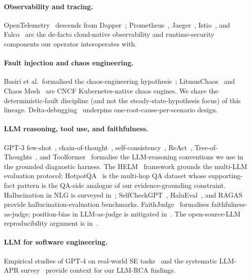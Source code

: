 \documentclass[sigconf, nonacm=true, anonymous=false, review=false]{acmart}
\begin{document}
\paragraph{Observability and tracing.} OpenTelemetry~\cite{opentelemetry_docs,
opentelemetry_operator} descends from Dapper~\cite{dapper_2010};
Prometheus~\cite{prometheus_cncf}, Jaeger~\cite{jaeger_cncf},
Istio~\cite{istio_service_mesh}, and Falco~\cite{falco_cncf} are
the de-facto cloud-native observability and runtime-security
components our operator interoperates with.

\paragraph{Fault injection and chaos engineering.}
Basiri et al.\ formalised the chaos-engineering
hypothesis~\cite{basiri_chaos_2016}; LitmusChaos~\cite{litmus_chaos_cncf}
and Chaos Mesh~\cite{chaos_mesh_cncf} are CNCF Kubernetes-native
chaos engines. We share the deterministic-fault discipline (and
not the steady-state-hypothesis focus) of this lineage.
Delta-debugging~\cite{zeller_delta_2002} underpins
one-root-cause-per-scenario design.

\paragraph{LLM reasoning, tool use, and faithfulness.}
GPT-3 few-shot~\cite{brown_gpt3_2020}, chain-of-thought~\cite{wei2022cot},
self-consistency~\cite{wang_selfconsistency_2023},
ReAct~\cite{yao2023react}, Tree-of-Thoughts~\cite{yao_tot_2023}, and
Toolformer~\cite{schick_toolformer_2023} formalise the
LLM-reasoning conventions we use in the grounded diagnostic
harness. The HELM~\cite{liang_helm_2023} framework grounds the
multi-LLM evaluation protocol; HotpotQA~\cite{yang_hotpotqa_2018}
is the multi-hop QA dataset whose
supporting-fact pattern is the QA-side analogue of our
evidence-grounding constraint. Hallucination in NLG is surveyed
in~\cite{ji2023hallucination}; SelfCheckGPT~\cite{manakul_selfcheckgpt_2023},
HaluEval~\cite{li_halueval_2023}, and RAGAS~\cite{es_ragas_2023}
provide hallucination-evaluation benchmarks.
FaithJudge~\cite{tamber_faithjudge_2025} formalises
faithfulness-as-judge; position-bias in LLM-as-judge is mitigated
in~\cite{shi_position_bias_2024}. The open-source-LLM
reproducibility argument is in~\cite{llm_open_advantage}.

\paragraph{LLM for software engineering.} Empirical studies of
GPT-4 on real-world SE tasks~\cite{gpt4_vulnerability_2024,
zhang_gpt4_se_replicate_2024} and the systematic LLM-APR
survey~\cite{llm_apr_survey_2024} provide context for our LLM-RCA
findings.
\end{document}
